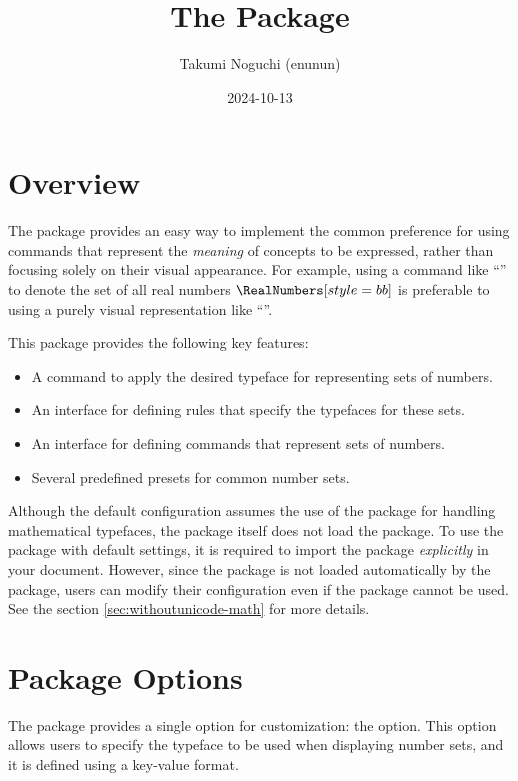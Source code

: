 \documentclass{l3doc}
\title{The \ThisPackageName{} Package}
\author{Takumi Noguchi (enunun)}
\date{2024-10-13}
\begin{document}
\maketitle

\tableofcontents

\section{Overview}

The \ThisPackageName{} package provides an easy way to implement the common preference for using commands
that represent the \emph{meaning} of concepts to be expressed,
rather than focusing solely on their visual appearance.
For example, using a command like ``'' to denote the set of all real numbers \(\RealNumbers[style=bb]\) is preferable
to using a purely visual representation like ``''.

This package provides the following key features:
\begin{itemize}
	\item A command to apply the desired typeface for representing sets of numbers.
	\item An interface for defining rules that specify the typefaces for these sets.
	\item An interface for defining commands that represent sets of numbers.
	\item Several predefined presets for common number sets.
\end{itemize}

Although the default configuration assumes the use of the  package for handling mathematical typefaces,
the \ThisPackageName{} package itself does not load the  package.
To use the package with default settings,
it is required to import the  package \emph{explicitly} in your document.
However, since the  package is not loaded automatically by the \ThisPackageName{} package,
users can modify their configuration even if the  package cannot be used.
See the section \ref{sec:withoutunicode-math} for more details.


\section{Package Options}
\label{sec:packageoptions}

The \ThisPackageName{} package provides a single option for customization:
the  option.
This option allows users to specify the typeface to be used when displaying number sets,
and it is defined using a key-value format.
\end{document}
